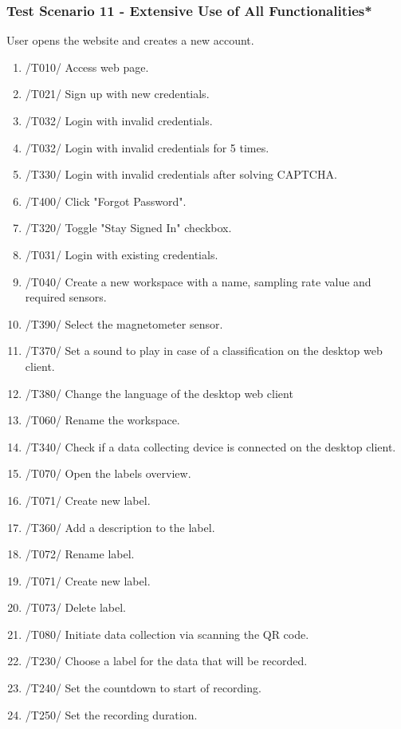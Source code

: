 \subsubsection{Test Scenario 11 - Extensive Use of All Functionalities*}
User opens the website and creates a new account. 
\begin{enumerate}
    \item /T010/ Access web page. 
    \item /T021/ Sign up with new credentials.
    \item /T032/ Login with invalid credentials.
    \item /T032/ Login with invalid credentials for 5 times.
    \item /T330/ Login with invalid credentials after solving CAPTCHA.
    \item /T400/ Click "Forgot Password".
    \item /T320/ Toggle "Stay Signed In" checkbox.
    \item /T031/ Login with existing credentials.
    \item /T040/ Create a new \gls{workspace} with a name, sampling rate value and required \glspl{sensor}.
    \item /T390/ Select the magnetometer sensor.
    \item /T370/ Set a sound to play in case of a classification on the desktop web client.
    \item /T380/ Change the language of the desktop web client
    \item /T060/ Rename the \gls{workspace}.
    \item /T340/ Check if a data collecting device is connected on the desktop client.
    \item /T070/ Open the labels overview.
    \item /T071/ Create new label.
    \item /T360/ Add a description to the label.
    \item /T072/ Rename label.
    \item /T071/ Create new label.
    \item /T073/ Delete label.
    \item /T080/ Initiate data collection via scanning the \gls{QR code}.
    \item /T230/ Choose a \gls{label} for the data that will be recorded.
    \item /T240/ Set the countdown to start of recording.
    \item /T250/ Set the recording duration.

\end{enumerate}
